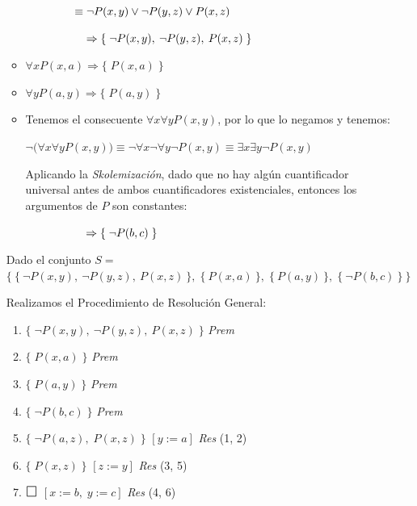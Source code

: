 \documentclass[12pt,letterpaper]{article}
\begin{document}
\begin{enumerate}
\begin{itemize}
    \( \hspace{1.5cm} \equiv \neg P(x, y) \lor \neg P(y, z) \lor P(x, z) \)

    \( \hspace{1.86cm} \Rightarrow \{\; {\neg P(x, y),\: \neg P(y, z),\: P(x, z) }\; \} \)

  \item \( \forall x P(x, a) \Rightarrow \{\; P(x, a)\; \} \)
  \item \( \forall y P(a, y) \Rightarrow \{\; P(a, y)\; \} \)
  \item Tenemos el consecuente \( \forall x \forall y P(x, y) \), por lo que lo negamos y tenemos:

    \( \neg \big(\forall x \forall y P(x, y)\big) \equiv \neg \forall x \neg \forall y \neg P(x, y) \equiv \exists x \exists y \neg P(x, y) \)

    Aplicando la \textit{Skolemizaci\'{o}n}, dado que no hay alg\'{u}n cuantificador universal antes de ambos cuantificadores existenciales, entonces los argumentos de $P$ son constantes:
    
    \( \hspace{1.86cm} \Rightarrow \{\; \neg P(b, c)\;  \} \)
  \end{itemize}

  Dado el conjunto $S =$ \( \Big\{\: \{\: \neg P(x, y),\: \neg P(y, z),\: P(x, z) \: \}, \; \{\: P(x, a)\: \},\;  \{\: P(a, y)\: \},\; \{\: \neg P(b, c)\: \} \:\Big\} \)

  Realizamos el Procedimiento de Resoluci\'{o}n General:
  
  \begin{center}
    \begin{enumerate}[label=\arabic*.]
    \item \( \{\; \neg P(x, y),\: \neg P(y, z),\: P(x, z) \; \} \) \quad \textit{Prem}
    \item \( \{\; P(x, a)\; \} \) \hspace{3.9cm} \textit{Prem}
    \item \( \{\; P(a, y)\; \} \) \hspace{3.9cm} \textit{Prem}
    \item \( \{\; \neg P(b, c)\; \} \) \hspace{3.7cm} \textit{Prem}
    \item \( \{\; \neg P(a, z),\; P(x, z)\; \}\) \hspace{0.2cm} $[y := a]$ \hspace{0.22cm} \textit{Res} (1, 2)
    \item \( \{\; P(x, z)\; \}\) \hspace{2.05cm} $[z := y]$ \hspace{0.22cm} \textit{Res} (3, 5)
    \item $\scalebox{1.3}{$\square$}$ \hspace{2.23cm} $[x := b,\; y := c]$ \hspace{0.22cm} \textit{Res} (4, 6)
    \end{enumerate}
  \end{center}


\end{enumerate}
\end{document}
